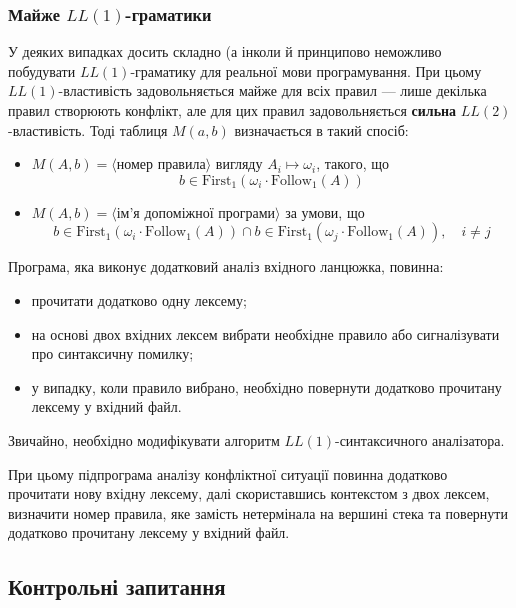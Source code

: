 \subsubsection{Майже \texorpdfstring{$LL(1)$}{LL1}-граматики}

У деяких випадках досить складно (а інколи й принципово неможливо побудувати $LL(1)$-граматику для реальної мови програмування. При цьому $LL(1)$-властивість задовольняється майже для всіх правил --- лише декілька правил створюють конфлікт, але для цих правил задовольняється \textbf{сильна} $LL(2)$-властивість. Тоді таблиця $M(a,b)$ визначається в такий спосіб:
\begin{itemize}
	\item $M(A,b) = \langle\text{номер правила}\rangle$ вигляду $A_i \mapsto \omega_i$, такого, що
	\begin{equation}
	    b \in \text{First}_1(\omega_i \cdot \text{Follow}_1(A))
	\end{equation}
	\item $M(A,b) = \langle\text{ім'я допоміжної програми}\rangle$ за умови, що
	\begin{equation}
	    b \in \text{First}_1(\omega_i \cdot \text{Follow}_1(A)) \cap b \in \text{First}_1(\omega_j \cdot \text{Follow}_1(A)), \quad i \ne j
	\end{equation}
\end{itemize}

Програма, яка виконує додатковий аналіз вхідного ланцюжка, повинна:
\begin{itemize}
	\item прочитати додатково одну лексему;
	\item на основі двох вхідних лексем вибрати необхідне правило або сигналізувати про синтаксичну помилку;
	\item у випадку, коли правило вибрано, необхідно повернути додатково прочитану лексему у вхідний файл.
\end{itemize}

Звичайно, необхідно модифікувати алгоритм $LL(1)$-син\-так\-сич\-но\-го \allowbreak аналізатора. \medskip

При цьому підпрограма аналізу конфліктної ситуації повинна додатково прочитати нову вхідну лексему, далі скориставшись контекстом з двох лексем, визначити номер правила, яке замість нетермінала на вершині стека та повернути додатково прочитану лексему у вхідний файл.

\subsection{Контрольні запитання}

